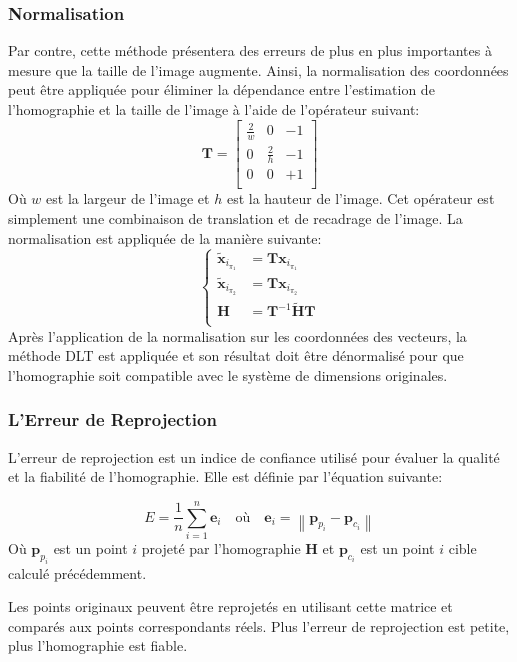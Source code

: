 \documentclass[../CSC_5RO17_TA_TP1.tex]{subfiles}
\begin{document}
\subsubsection{Normalisation}
\noindent Par contre, cette méthode présentera des erreurs de plus en plus importantes à mesure que la taille de l'image augmente. Ainsi, la normalisation des coordonnées peut être appliquée pour éliminer la dépendance entre l'estimation de l'homographie et la taille de l'image à l'aide de l'opérateur suivant:
\begin{equation}
    \boxed{
        \mathbf{T}
        =
        \begin{bmatrix}
            \frac{2}{w} & 0 & -1\\
            0 & \frac{2}{h} & -1\\
            0 & 0 & +1\\
        \end{bmatrix}
    }
\end{equation}
Où $w$ est la largeur de l'image et $h$ est la hauteur de l'image. Cet opérateur est simplement une combinaison de translation et de recadrage de l'image. La normalisation est appliquée de la manière suivante:
\begin{equation*}
    \left\{
    \begin{aligned}
        \widetilde{\mathbf{x}}_{i_{\pi_{1}}} &= \mathbf{T}\mathbf{x}_{i_{\pi_{1}}}\\
        \widetilde{\mathbf{x}}_{i_{\pi_{2}}} &= \mathbf{T}\mathbf{x}_{i_{\pi_{2}}}\\
        \mathbf{H} &= \mathbf{T}^{-1}\widetilde{\mathbf{H}}\mathbf{T}\\
    \end{aligned}
    \right.
\end{equation*}
Après l'application de la normalisation sur les coordonnées des vecteurs, la méthode DLT est appliquée et son résultat doit être dénormalisé pour que l'homographie soit compatible avec le système de dimensions originales.

\subsubsection{L'Erreur de Reprojection}
\noindent L'erreur de reprojection est un indice de confiance utilisé pour évaluer la qualité et la fiabilité de l'homographie. Elle est définie par l'équation suivante:

\begin{equation}
    \boxed{
        E = \frac{1}{n} \sum_{i=1}^{n}\mathbf{e}_{i}
        \quad\text{où}\quad
        \mathbf{e}_{i} = \left\lVert \mathbf{p}_{p_{i}} - \mathbf{p}_{c_{i}} \right\rVert
    }
\end{equation}
Où $\mathbf{p}_{p_{i}}$ est un point $i$ projeté par l'homographie $\mathbf{H}$ et $\mathbf{p}_{c_{i}}$ est un point $i$ cible calculé précédemment.
\begin{remark}
    Les points originaux peuvent être reprojetés en utilisant cette matrice et comparés aux points correspondants réels. Plus l'erreur de reprojection est petite, plus l'homographie est fiable.
\end{remark}
\end{document}
